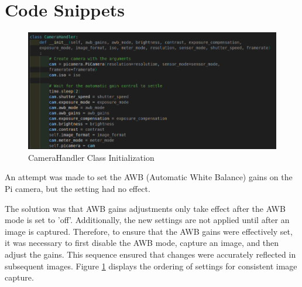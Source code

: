 \appendix
\section{Code Snippets}
\label{app:code_snippets}
\begin{figure}[H]
	\centering
	\includegraphics[width=\textwidth]{Images/Code Screenshots/camerahandler.png}
	\caption{CameraHandler Class Initialization}
	\label{fig:code_camerahandler}
\end{figure}

An attempt was made to set the AWB (Automatic White Balance) gains on the Pi camera, but the setting had no effect.

The solution was that AWB gains adjustments only take effect after the AWB mode is set to 'off'. Additionally, the new settings are not applied until after an image is captured. Therefore, to ensure that the AWB gains were effectively set, it was necessary to first disable the AWB mode, capture an image, and then adjust the gains. This sequence ensured that changes were accurately reflected in subsequent images. Figure \ref{fig:code_camerahandler} displays the ordering of settings for consistent image capture. 

